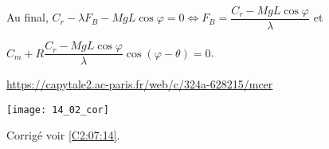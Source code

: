 Au final, 
$C_r-\lambda F_B  -MgL \cos \varphi= 0 \Leftrightarrow  F_B  = \dfrac{C_r -MgL \cos \varphi}{\lambda}  $
et
 
$C_m +R \dfrac{C_r -MgL \cos \varphi}{\lambda} \cos \left(\varphi - \theta \right) = 0$.
\else
\fi


\ifprof
\url{https://capytale2.ac-paris.fr/web/c/324a-628215/mcer}
\begin{center}
\texttt{[image: 14\_02\_cor]}
\end{center}
\else
\fi


\ifprof
\else
\begin{flushright}
\footnotesize{Corrigé  voir \ref{C2:07:14}.}
\end{flushright}%
\fi